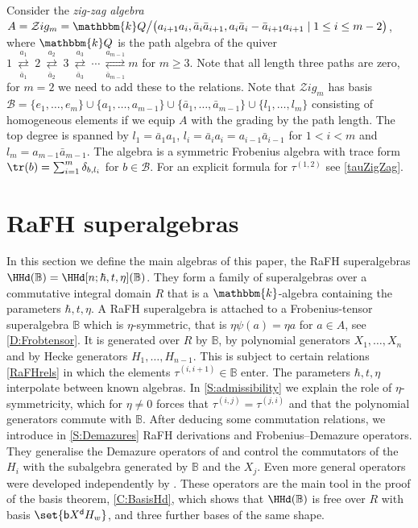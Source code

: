 \documentclass[a4paper,11pt]{amsart}
\newcommand\cB{\mathcal{B}}
\numberwithin{equation}{subsection}
\theoremstyle{definition}
\theoremstyle{theorem}
\theoremstyle{remark}
\newcommand\bd{\mathsf{d}}
\newcommand\bb{\mathsf{b}}
\newcommand\taui[1][i]{\tau^{(#1)}}
\newcommand\kk{\mathbbm{k}}
\newcommand\RR{R}
\newcommand{\Bo}{\mathbb{B}}
\begin{document}
  \begin{Example}\label{Ex:ZigZagm}
Consider the  \emph{zig-zag algebra} $A=\mathcal{Z}ig_m=\kk Q\big/\bigl(a_{i+1}a_i,\bar a_i\bar a_{i+1}, a_i\bar a_ i -\bar a_{i+1}a_{i+1}\mid 1\leq i\leq m-2 \bigr)
$, where $\kk Q$ is the path algebra of the quiver $
  1\ \underset{\bar a_1}{\overset{a_1}{\rightleftarrows}}\ 2
   \ \underset{\bar a_2}{\overset{a_2}{\rightleftarrows}}\ 3
   \ \underset{\bar a_3}{\overset{a_3}{\rightleftarrows}}\ \cdots
   \ \underset{\bar a_{m-1}}{\overset{a_{m-1}}{\rightleftarrows}} m
$ for $m\geq 3$. Note that all length three paths are zero, for $m=2$  we need to add these to the relations.
Note that $\mathcal{Z}ig_m$  has basis $\cB=\{e_1,\dots,e_m\}\cup\{a_1,\dots,a_{m-1}\}\cup\{\bar a_1,\dots,\bar a_{m-1}\}\cup\{l_1,\dots,l_m\}$ consisting of homogeneous elements if we equip $A$ with the grading
 by the path length.  The  top degree is spanned by
 $l_1=\bar a_1a_1$, $l_i=\bar a_ia_i=a_{i-1}\bar a_{i-1}$  for $1<i<m$ and $l_m=a_{m-1}\bar a_{m-1}$.
The algebra is  a symmetric Frobenius algebra with trace form $\tr(b)=\sum_{i=1}^m\delta_{b,l_i}$ for $b\in \cB$. For an explicit formula for $\taui[1,2]$ see \autoref{tauZigZag}.
\end{Example}

  \section{RaFH superalgebras}\label{S:AffineRH}
In this section we define the main algebras of this paper, the RaFH superalgebras
$\HHd(\Bo)=\HHd[n;\hbar,t,\eta](\Bo)$. They form a family of  superalgebras over a commutative integral domain $R$ that is a $\kk$-algebra containing the parameters $\hbar,t,\eta$. A RaFH superalgebra is attached to a
Frobenius-tensor superalgebra $\Bo$ which is $\eta$-symmetric, that is $\eta\psi(a)=\eta a$ for
$a\in A$, see \autoref{D:Frobtensor}. It is generated over $R$ by $\Bo$, by polynomial generators
$X_1,\dots,X_n$ and by Hecke generators $H_1,\dots,H_{n-1}$. This is subject to certain relations
\autoref{RaFHrels} in which the elements $\tau^{(i,i+1)}\in\Bo$ enter. The parameters
$\hbar,t,\eta$ interpolate between known algebras.  In \autoref{S:admissibility} we explain the
role of $\eta$-symmetricity, which for $\eta\ne0$ forces that $\tau^{(i,j)}=\tau^{(j,i)}$ and that the
polynomial generators commute with $\Bo$. After deducing some commutation relations, we introduce
in \autoref{S:Demazures} RaFH derivations and Frobenius--Demazure operators. They generalise the
Demazure operators of \cite{Savage:AffineWreath,RossoSavage:QuantumAffineWreath}  and
control the commutators of the $H_i$ with the subalgebra generated by $\Bo$ and the $X_j$.  Even more general operators were developed independently by \cite{LaiMinets, MinetsYBE}. These operators
are the main tool in the proof of the basis theorem, \autoref{C:BasisHd}, which shows that $\HHd(\Bo)$ is free
over $\RR$ with basis $\set{\bb X^\bd H_w}$, and three further bases of the same shape.\\
\end{document}
